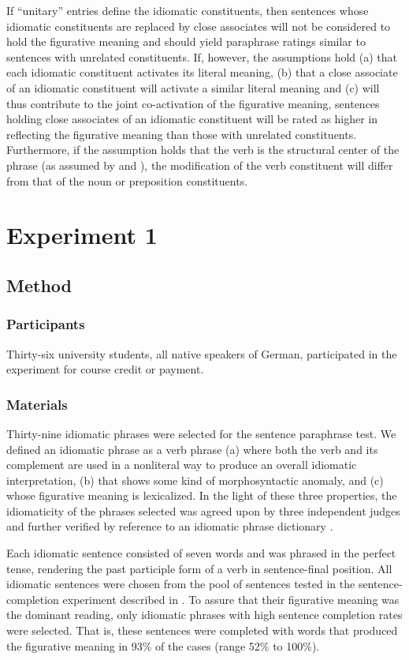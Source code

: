 \documentclass[output=paper]{langsci/langscibook}
\begin{document}
If ``unitary'' entries define the idiomatic constituents, then sentences whose idiomatic constituents are replaced by close associates will not be considered to hold the figurative meaning and should yield paraphrase ratings similar to sentences with unrelated constituents. If, however, the assumptions hold (a) that each idiomatic constituent activates its literal meaning, (b) that a close associate of an idiomatic constituent will activate a similar literal meaning and (c) will thus contribute to the joint co-activation of the figurative meaning, sentences holding close associates of an idiomatic constituent will be rated as higher in reflecting the figurative meaning than those with unrelated constituents. Furthermore, if the assumption holds that the verb is the structural center of the phrase (as assumed by \citealt{rabanus:2008} and \citealt{smolka:2007}), the modification of the verb constituent will differ from that of the noun or preposition constituents. 

\section{Experiment 1}

\subsection{Method}
\subsubsection{Participants}
Thirty-six university students, all native speakers of German, participated in the experiment for course credit or payment.

\subsubsection{Materials}
Thirty-nine idiomatic phrases were selected for the sentence paraphrase test. We defined an idiomatic phrase as a verb phrase (a) where both the verb and its complement are used in a nonliteral way to produce an overall idiomatic interpretation, (b) that shows some kind of morphosyntactic anomaly, and (c) whose figurative meaning is lexicalized.  In the light of these three properties, the idiomaticity of the phrases selected was agreed upon by three independent judges and further verified by reference to an idiomatic phrase dictionary \citep{redewendungen:2002}.

Each idiomatic sentence consisted of seven words and was phrased in the perfect tense, rendering the past participle form of a verb in sentence-final position. All idiomatic sentences were chosen from the pool of sentences tested in the sentence-completion experiment described in \citet{smolka:2007}. To assure that their figurative meaning was the dominant reading, only idiomatic phrases with high sentence completion rates were selected. That is, these sentences were completed with words that produced the figurative meaning in 93\% of the cases (range 52\% to 100\%).
\end{document}
